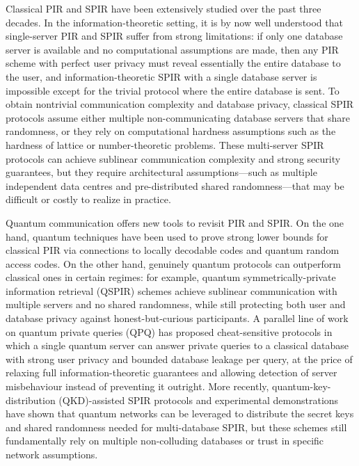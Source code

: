 \documentclass[%
 reprint,
superscriptaddress,
 amsmath,amssymb,
 aps,
]{revtex4-2}
\begin{document}
Classical PIR and SPIR have been extensively studied over the past three decades. In the information-theoretic setting, it is by now well understood that single-server PIR and SPIR suffer from strong limitations: if only one database server is available and no computational assumptions are made, then any PIR scheme with perfect user privacy must reveal essentially the entire database to the user, and information-theoretic SPIR with a single database server is impossible except for the trivial protocol where the entire database is sent.%
To obtain nontrivial communication complexity and database privacy, classical SPIR protocols assume either multiple non-communicating database servers that share randomness, or they rely on computational hardness assumptions such as the hardness of lattice or number-theoretic problems.%
These multi-server SPIR protocols can achieve sublinear communication complexity and strong security guarantees, but they require architectural assumptions—such as multiple independent data centres and pre-distributed shared randomness—that may be difficult or costly to realize in practice.%

Quantum communication offers new tools to revisit PIR and SPIR. On the one hand, quantum techniques have been used to prove strong lower bounds for classical PIR via connections to locally decodable codes and quantum random access codes. On the other hand, genuinely quantum protocols can outperform classical ones in certain regimes: for example, quantum symmetrically-private information retrieval (QSPIR) schemes achieve sublinear communication with multiple servers and no shared randomness, while still protecting both user and database privacy against honest-but-curious participants.%
A parallel line of work on quantum private queries (QPQ) has proposed cheat-sensitive protocols in which a single quantum server can answer private queries to a classical database with strong user privacy and bounded database leakage per query, at the price of relaxing full information-theoretic guarantees and allowing detection of server misbehaviour instead of preventing it outright.%
More recently, quantum-key-distribution (QKD)-assisted SPIR protocols and experimental demonstrations have shown that quantum networks can be leveraged to distribute the secret keys and shared randomness needed for multi-database SPIR, but these schemes still fundamentally rely on multiple non-colluding databases or trust in specific network assumptions.%
\end{document}
